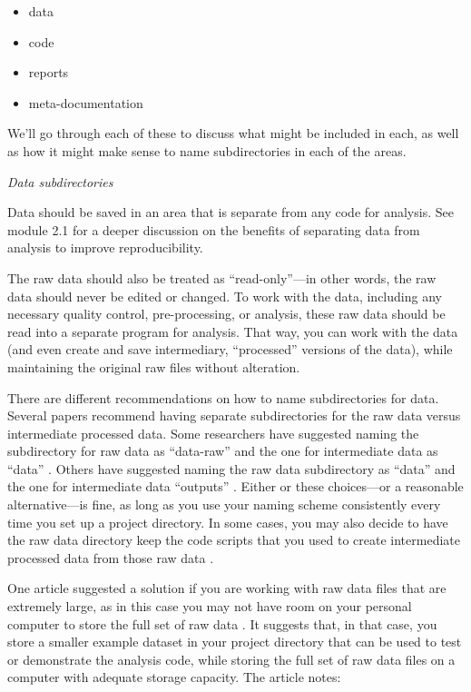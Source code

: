 \documentclass[]{tufte-book}
\providecommand{\tightlist}{%
  \setlength{\itemsep}{0pt}\setlength{\parskip}{0pt}}
\begin{document}
\begin{itemize}
\tightlist
\item
  data
\item
  code
\item
  reports
\item
  meta-documentation
\end{itemize}

We'll go through each of these to discuss what might be included in each, as
well as how it might make sense to name subdirectories in each of the areas.

\emph{Data subdirectories}

Data should be saved in an area that is separate from any code for analysis.
See module 2.1 for a deeper discussion on the benefits of separating data
from analysis to improve reproducibility.

The raw data should also be treated as ``read-only''---in other words, the raw
data should never be edited or changed. To work with the data, including any
necessary quality control, pre-processing, or analysis, these raw data should be
read into a separate program for analysis. That way, you can work with the
data (and even create and save intermediary, ``processed'' versions of the
data), while maintaining the original raw files without alteration.

There are different recommendations on how to name subdirectories for data.
Several papers recommend having separate subdirectories for the raw data versus
intermediate processed data. Some researchers have suggested naming the
subdirectory for raw data as ``data-raw'' and the one for intermediate data as
``data'' \citep{vuorre2021sharing, prodigenr}. Others have suggested naming the raw
data subdirectory as ``data'' and the one for intermediate data ``outputs''
\citep{blischak2019creating}. Either or these choices---or a reasonable
alternative---is fine, as long as you use your naming scheme consistently every
time you set up a project directory. In some cases, you may also decide to have
the raw data directory keep the code scripts that you used to create
intermediate processed data from those raw data \citep{prodigenr}.

One article suggested a solution if you are working with raw data files that
are extremely large, as in this case you may not have room on your personal
computer to store the full set of raw data \citep{marwick2018packaging}. It
suggests that, in that case, you store a smaller example dataset in your
project directory that can be used to test or demonstrate the analysis code,
while storing the full set of raw data files on a computer with adequate
storage capacity. The article notes:
\end{document}
